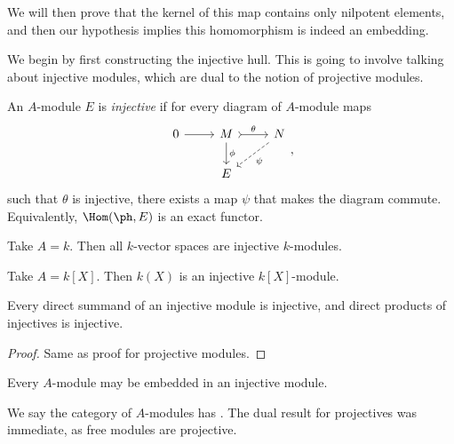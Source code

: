 \documentclass[a4paper]{article}
\begin{document}
We will then prove that the kernel of this map contains only nilpotent elements, and then our hypothesis implies this homomorphism is indeed an embedding.

We begin by first constructing the injective hull. This is going to involve talking about injective modules, which are dual to the notion of projective modules.
\begin{defi}
  An $A$-module $E$ is \emph{injective} if for every diagram of $A$-module maps
  \[
    \begin{tikzcd}
      0 \ar[r] & M \ar[r, "\theta", tail] \ar[d, "\phi"] & N \ar[ld, "\psi", dashed]\\
      & E
    \end{tikzcd},
  \]
  such that $\theta$ is injective, there exists a map $\psi$ that makes the diagram commute. Equivalently, $\Hom(\ph, E)$ is an exact functor.
\end{defi}

\begin{eg}
  Take $A = k$. Then all $k$-vector spaces are injective $k$-modules.
\end{eg}

\begin{eg}
  Take $A = k[X]$. Then $k(X)$ is an injective $k[X]$-module.
\end{eg}

\begin{lemma}
  Every direct summand of an injective module is injective, and direct products of injectives is injective.
\end{lemma}

\begin{proof}
  Same as proof for projective modules.
\end{proof}

\begin{lemma}
  Every $A$-module may be embedded in an injective module.
\end{lemma}
We say the category of $A$-modules has . The dual result for projectives was immediate, as free modules are projective.
\end{document}
